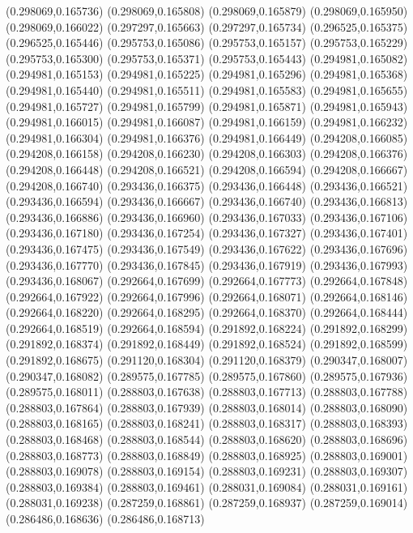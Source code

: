 (0.298069,0.165736)
(0.298069,0.165808)
(0.298069,0.165879)
(0.298069,0.165950)
(0.298069,0.166022)
(0.297297,0.165663)
(0.297297,0.165734)
(0.296525,0.165375)
(0.296525,0.165446)
(0.295753,0.165086)
(0.295753,0.165157)
(0.295753,0.165229)
(0.295753,0.165300)
(0.295753,0.165371)
(0.295753,0.165443)
(0.294981,0.165082)
(0.294981,0.165153)
(0.294981,0.165225)
(0.294981,0.165296)
(0.294981,0.165368)
(0.294981,0.165440)
(0.294981,0.165511)
(0.294981,0.165583)
(0.294981,0.165655)
(0.294981,0.165727)
(0.294981,0.165799)
(0.294981,0.165871)
(0.294981,0.165943)
(0.294981,0.166015)
(0.294981,0.166087)
(0.294981,0.166159)
(0.294981,0.166232)
(0.294981,0.166304)
(0.294981,0.166376)
(0.294981,0.166449)
(0.294208,0.166085)
(0.294208,0.166158)
(0.294208,0.166230)
(0.294208,0.166303)
(0.294208,0.166376)
(0.294208,0.166448)
(0.294208,0.166521)
(0.294208,0.166594)
(0.294208,0.166667)
(0.294208,0.166740)
(0.293436,0.166375)
(0.293436,0.166448)
(0.293436,0.166521)
(0.293436,0.166594)
(0.293436,0.166667)
(0.293436,0.166740)
(0.293436,0.166813)
(0.293436,0.166886)
(0.293436,0.166960)
(0.293436,0.167033)
(0.293436,0.167106)
(0.293436,0.167180)
(0.293436,0.167254)
(0.293436,0.167327)
(0.293436,0.167401)
(0.293436,0.167475)
(0.293436,0.167549)
(0.293436,0.167622)
(0.293436,0.167696)
(0.293436,0.167770)
(0.293436,0.167845)
(0.293436,0.167919)
(0.293436,0.167993)
(0.293436,0.168067)
(0.292664,0.167699)
(0.292664,0.167773)
(0.292664,0.167848)
(0.292664,0.167922)
(0.292664,0.167996)
(0.292664,0.168071)
(0.292664,0.168146)
(0.292664,0.168220)
(0.292664,0.168295)
(0.292664,0.168370)
(0.292664,0.168444)
(0.292664,0.168519)
(0.292664,0.168594)
(0.291892,0.168224)
(0.291892,0.168299)
(0.291892,0.168374)
(0.291892,0.168449)
(0.291892,0.168524)
(0.291892,0.168599)
(0.291892,0.168675)
(0.291120,0.168304)
(0.291120,0.168379)
(0.290347,0.168007)
(0.290347,0.168082)
(0.289575,0.167785)
(0.289575,0.167860)
(0.289575,0.167936)
(0.289575,0.168011)
(0.288803,0.167638)
(0.288803,0.167713)
(0.288803,0.167788)
(0.288803,0.167864)
(0.288803,0.167939)
(0.288803,0.168014)
(0.288803,0.168090)
(0.288803,0.168165)
(0.288803,0.168241)
(0.288803,0.168317)
(0.288803,0.168393)
(0.288803,0.168468)
(0.288803,0.168544)
(0.288803,0.168620)
(0.288803,0.168696)
(0.288803,0.168773)
(0.288803,0.168849)
(0.288803,0.168925)
(0.288803,0.169001)
(0.288803,0.169078)
(0.288803,0.169154)
(0.288803,0.169231)
(0.288803,0.169307)
(0.288803,0.169384)
(0.288803,0.169461)
(0.288031,0.169084)
(0.288031,0.169161)
(0.288031,0.169238)
(0.287259,0.168861)
(0.287259,0.168937)
(0.287259,0.169014)
(0.286486,0.168636)
(0.286486,0.168713)
